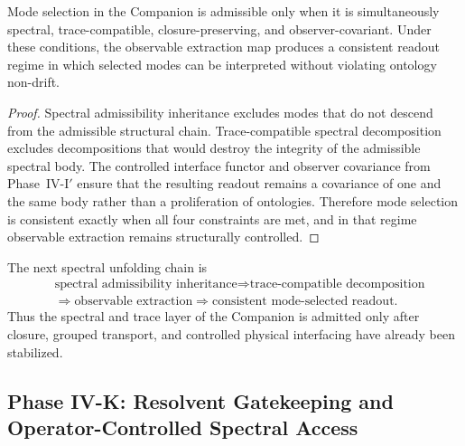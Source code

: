 \begin{theorem}
\label{thm:mode-selection-observable-consistency}
Mode selection in the Companion is admissible only when it is simultaneously spectral, trace-compatible, closure-preserving, and observer-covariant. Under these conditions, the observable extraction map produces a consistent readout regime in which selected modes can be interpreted without violating ontology non-drift.
\end{theorem}

\begin{proof}
Spectral admissibility inheritance excludes modes that do not descend from the admissible structural chain. Trace-compatible spectral decomposition excludes decompositions that would destroy the integrity of the admissible spectral body. The controlled interface functor and observer covariance from Phase~IV-I$'$ ensure that the resulting readout remains a covariance of one and the same body rather than a proliferation of ontologies. Therefore mode selection is consistent exactly when all four constraints are met, and in that regime observable extraction remains structurally controlled.
\end{proof}

\begin{corollary}
\label{cor:spectral-readout-reconstruction-chain}
The next spectral unfolding chain is
\[
\begin{aligned}
&\text{spectral admissibility inheritance}
\Longrightarrow
\text{trace-compatible decomposition}\\
&\Longrightarrow
\text{observable extraction}
\Longrightarrow
\text{consistent mode-selected readout}.
\end{aligned}
\]
Thus the spectral and trace layer of the Companion is admitted only after closure, grouped transport, and controlled physical interfacing have already been stabilized.
\end{corollary}




\subsection*{Phase IV-K: Resolvent Gatekeeping and Operator-Controlled Spectral Access}

